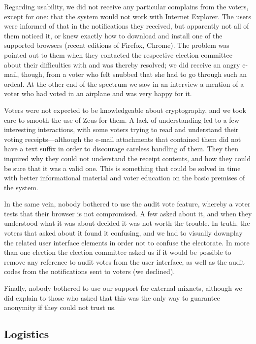 \documentclass[letterpaper,10pt]{article}
\begin{document}
Regarding usability, we did not receive any particular complains from
the voters, except for one: that the system would not work with
Internet Explorer. The users were informed of that in the
notifications they received, but apparently not all of them noticed
it, or knew exactly how to download and install one of the supported
browsers (recent editions of Firefox, Chrome). The problem was pointed
out to them when they contacted the respective election committee
about their difficulties with and was thereby resolved; we did receive
an angry e-mail, though, from a voter who felt snubbed that she had
to go through such an ordeal. At the other end of the spectrum we saw
in an interview a mention of a voter who had voted in an airplane and
was very happy for it.

Voters were not expected to be knowledgeable about cryptography, and
we took care to smooth the use of Zeus for them. A lack of
understanding led to a few interesting interactions, with some voters
trying to read and understand their voting receipts---although the
e-mail attachments that contained them did not have a text suffix in
order to discourage careless handling of them. They then inquired why
they could not understand the receipt contents, and how they could be
sure that it was a valid one. This is something that could be solved
in time with better informational material and voter education on the
basic premises of the system.

In the same vein, nobody bothered to use the audit vote feature,
whereby a voter tests that their browser is not compromised. A few
asked about it, and when they understood what it was about decided it
was not worth the trouble. In truth, the voters that asked about it
found it confusing, and we had to visually downplay the related user
interface elements in order not to confuse the electorate. In more
than one election the election committee asked us if it would be
possible to remove any reference to audit votes from the user
interface, as well as the audit codes from the notifications sent to
voters (we declined).

Finally, nobody bothered to use our support for external mixnets,
although we did explain to those who asked that this was the only way
to guarantee anonymity if they could not trust us.

\subsection{Logistics}
\label{ssec:logistics}
\end{document}
